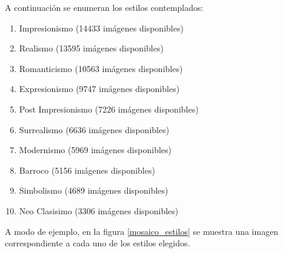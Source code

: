 \documentclass[a4paper,11pt,spanish]{book}
\begin{document}
    A continuación se enumeran los estilos contemplados:
    \begin{enumerate}
      \item Impresionismo  (14433 imágenes disponibles)
      \item Realismo (13595 imágenes disponibles)
      \item Romanticismo (10563 imágenes disponibles)
      \item Expresionismo (9747 imágenes disponibles)
      \item Post Impresionismo (7226 imágenes disponibles)
      \item Surrealismo (6636 imágenes disponibles)
      \item Modernismo (5969 imágenes disponibles)
      \item Barroco (5156 imágenes disponibles)
      \item Simbolismo (4689 imágenes disponibles)
      \item Neo Clasisimo (3306 imágenes disponibles)
    \end{enumerate}
      A modo de ejemplo, en la figura \ref{mosaico_estilos} se muestra una imagen correspondiente a cada uno de los estilos elegidos.
\end{document}
